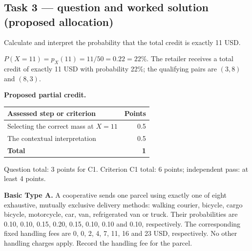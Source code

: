 \par\vspace{3mm}\secInicio[][sec:q2]

\subsection*{Task 3 --- question and worked solution (proposed allocation) }
\label{sol:q2t3}

Calculate and interpret the probability that the total credit is exactly 11 USD.

$P(X=11)=p_X(11)=11/50=0.22=22\%$. The retailer receives a total credit of exactly 11 USD with probability 22\%; the qualifying pairs are $(3,8)$ and $(8,3)$.

\par\smallskip
\noindent\begin{minipage}{\linewidth}
\textbf{Proposed partial credit.}\par\smallskip
\begin{tabularx}{\linewidth}{@{}>{\raggedright\arraybackslash}X r@{}}\toprule
\textbf{Assessed step or criterion} & \textbf{Points}\\\midrule
Selecting the correct mass at $X=11$ & 0.5\\
The contextual interpretation & 0.5\\
\midrule
\textbf{Total} & \textbf{1}\\
\bottomrule\end{tabularx}
\end{minipage}\par\smallskip

Question total: 3 points for C1. Criterion C1 total: 6 points; independent pass: at least 4 points.

\par\vspace{3mm}\secInicio[][sec:q2]

\clearpage
{}

\textbf{Basic Type A.} A cooperative sends one parcel using exactly one of eight exhaustive, mutually exclusive delivery methods: walking courier, bicycle, cargo bicycle, motorcycle, car, van, refrigerated van or truck. Their probabilities are 0.10, 0.10, 0.15, 0.20, 0.15, 0.10, 0.10 and 0.10, respectively. The corresponding fixed handling fees are 0, 0, 2, 4, 7, 11, 16 and 23 USD, respectively. No other handling charges apply. Record the handling fee for the parcel.

